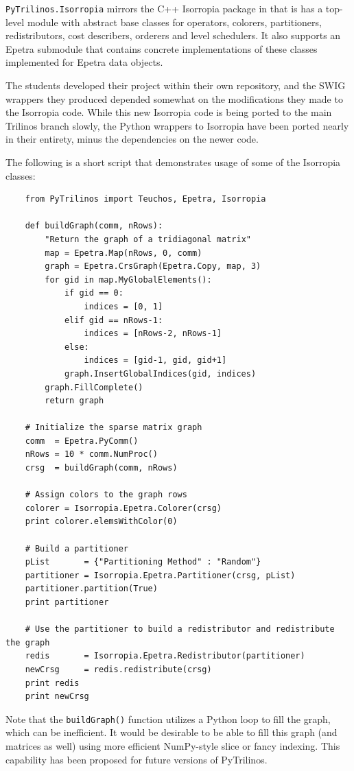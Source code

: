 \documentclass[11pt]{article}
\begin{document}
{\tt PyTrilinos.Isorropia} mirrors the C++ Isorropia package in that is has a top-level module with abstract base classes for operators, colorers, partitioners, redistributors, cost describers, orderers and level schedulers.  It also supports an Epetra submodule that contains concrete implementations of these classes implemented for Epetra data objects.

The students developed their project within their own repository, and the SWIG wrappers they produced depended somewhat on the modifications they made to the Isorropia code.  While this new Isorropia code is being ported to the main Trilinos branch slowly, the Python wrappers to Isorropia have been ported nearly in their entirety, minus the dependencies on the newer code.

The following is a short script that demonstrates usage of some of the Isorropia classes:
\begin{verbatim}
    from PyTrilinos import Teuchos, Epetra, Isorropia

    def buildGraph(comm, nRows):
        "Return the graph of a tridiagonal matrix"
        map = Epetra.Map(nRows, 0, comm)
        graph = Epetra.CrsGraph(Epetra.Copy, map, 3)
        for gid in map.MyGlobalElements():
            if gid == 0:
                indices = [0, 1]
            elif gid == nRows-1:
                indices = [nRows-2, nRows-1]
            else:
                indices = [gid-1, gid, gid+1]
            graph.InsertGlobalIndices(gid, indices)
        graph.FillComplete()
        return graph

    # Initialize the sparse matrix graph
    comm  = Epetra.PyComm()
    nRows = 10 * comm.NumProc()
    crsg  = buildGraph(comm, nRows)

    # Assign colors to the graph rows
    colorer = Isorropia.Epetra.Colorer(crsg)
    print colorer.elemsWithColor(0)

    # Build a partitioner
    pList       = {"Partitioning Method" : "Random"}
    partitioner = Isorropia.Epetra.Partitioner(crsg, pList)
    partitioner.partition(True)
    print partitioner

    # Use the partitioner to build a redistributor and redistribute the graph
    redis       = Isorropia.Epetra.Redistributor(partitioner)
    newCrsg     = redis.redistribute(crsg)
    print redis
    print newCrsg
\end{verbatim}

Note that the {\tt buildGraph()} function utilizes a Python loop to fill the graph, which can be inefficient.  It would be desirable to be able to fill this graph (and matrices as well) using more efficient NumPy-style slice or fancy indexing.  This capability has been proposed for future versions of PyTrilinos.
\end{document}
